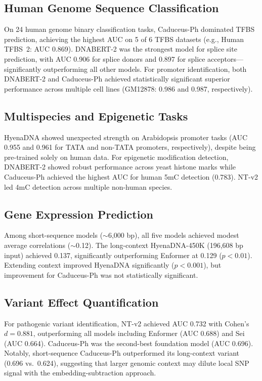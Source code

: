 \documentclass[11pt]{article}
\begin{document}
\subsection{Human Genome Sequence Classification}

On 24 human genome binary classification tasks, Caduceus-Ph dominated TFBS prediction, achieving the highest AUC on 5 of 6 TFBS datasets (e.g., Human TFBS~2: AUC 0.869). DNABERT-2 was the strongest model for splice site prediction, with AUC 0.906 for splice donors and 0.897 for splice acceptors---significantly outperforming all other models. For promoter identification, both DNABERT-2 and Caduceus-Ph achieved statistically significant superior performance across multiple cell lines (GM12878: 0.986 and 0.987, respectively).

\subsection{Multispecies and Epigenetic Tasks}

HyenaDNA showed unexpected strength on Arabidopsis promoter tasks (AUC 0.955 and 0.961 for TATA and non-TATA promoters, respectively), despite being pre-trained solely on human data. For epigenetic modification detection, DNABERT-2 showed robust performance across yeast histone marks while Caduceus-Ph achieved the highest AUC for human 5mC detection (0.783). NT-v2 led 4mC detection across multiple non-human species.

\subsection{Gene Expression Prediction}

Among short-sequence models ($\sim$6,000 bp), all five models achieved modest average correlations ($\sim$0.12). The long-context HyenaDNA-450K (196,608 bp input) achieved 0.137, significantly outperforming Enformer at 0.129 ($p < 0.01$). Extending context improved HyenaDNA significantly ($p < 0.001$), but improvement for Caduceus-Ph was not statistically significant.

\subsection{Variant Effect Quantification}

For pathogenic variant identification, NT-v2 achieved AUC 0.732 with Cohen's $d = 0.881$, outperforming all models including Enformer (AUC 0.688) and Sei (AUC 0.664). Caduceus-Ph was the second-best foundation model (AUC 0.696). Notably, short-sequence Caduceus-Ph outperformed its long-context variant (0.696 vs.\ 0.624), suggesting that larger genomic context may dilute local SNP signal with the embedding-subtraction approach.
\end{document}
